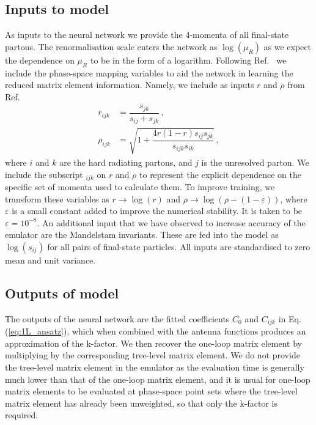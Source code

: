 \documentclass[main.tex]{subfiles}
\begin{document}
\subsection*{Inputs to model}
As inputs to the neural network we provide the 4-momenta of all
final-state partons. The renormalisation scale enters the network
as $\log(\mu_{R})$ as we expect the dependence on $\mu_{R}$
to be in the form of a logarithm. Following Ref.~\cite{Maitre:2021uaa}
we include the phase-space mapping variables to aid the network in learning
the reduced matrix element information. Namely, we include as
inputs $r$ and $\rho$ from Ref.~\cite{Kosower:1997zr}
\begin{align}
    r_{ijk} &= \dfrac{s_{jk}}{s_{ij} + s_{jk}} \, , \\
    \rho_{ijk} &= \sqrt{1 + \dfrac{4r(1-r)s_{ij}s_{jk}}{s_{ijk}s_{ik}}} \, ,
    \label{eq:map_variables}
\end{align}
where $i$ and $k$ are the hard radiating partons, and $j$ is
the unresolved parton. We include the subscript
$_{ijk}$ on $r$ and $\rho$ to represent the explicit
dependence on the specific set of momenta used to calculate them.
To improve training, we transform these variables as
$r \rightarrow \log(r)$ and $\rho \rightarrow \log(\rho - (1 - \varepsilon))$,
where $\varepsilon$ is a small constant added to improve the
numerical stability. It is taken to be $\varepsilon = 10^{-8}$.
An additional input that we have observed to increase
accuracy of the emulator are the Mandelstam invariants.
These are fed into the model as $\log(s_{ij})$ for all
pairs of final-state particles. All inputs are
standardised to zero mean and unit variance.

\subsection*{Outputs of model}
The outputs of the neural network are the fitted coefficients $C_{0}$ and $C_{ijk}$
in Eq. (\ref{eq:1L_ansatz}), which when combined with the antenna functions
produces an approximation of the k-factor. We then recover the
one-loop matrix element by multiplying by the corresponding
tree-level matrix element. We do not provide the tree-level matrix
element in the emulator as the evaluation time is generally
much lower than that of the one-loop matrix element, and it is usual 
for one-loop matrix elements to be evaluated at phase-space point sets
where the tree-level matrix element has already been unweighted, so that 
only the k-factor is required.
\end{document}
